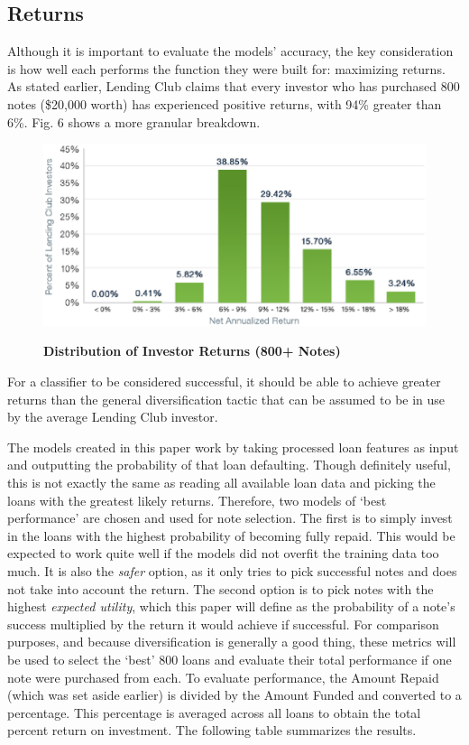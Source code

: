 \subsection{Returns}
\label{experiments.returns}
Although it is important to evaluate the models' accuracy, the key consideration is how well each performs the function 
they were built for: maximizing returns. As stated earlier, Lending Club claims that every investor who has purchased 
800 notes (\$20,000 worth) has experienced positive returns, with 94\% greater than 6\%. Fig. 6 shows a 
more granular breakdown.


\begin{figure}[!h]
    \centering
    \includegraphics[scale=0.5]{figs/lc_stats.eps}
    \label{fig:lc_stats}
    \caption{\textbf{Distribution of Investor Returns (800+ Notes)}}
\end{figure}

For a classifier to be considered successful, it should be able to achieve greater returns than the general diversification tactic
that can be assumed to be in use by the average Lending Club investor.

The models created in this paper work by taking processed loan features as input and outputting the probability of that loan
defaulting. Though definitely useful, this is not exactly the same as reading all available loan data and picking the loans 
with the greatest likely returns. Therefore, two models of `best performance' are chosen and used for note selection. 
The first is to simply invest in the loans with the highest probability of becoming fully repaid. This would be expected to work
quite well if the models did not overfit the training data too much. It is also the \emph{safer} option, as it only tries
to pick successful notes and does not take into account the return. The second option is to pick notes with the highest 
\emph{expected utility}, which this paper will define as the probability of a note's success multiplied by the return it would achieve
if successful. For comparison purposes, and because diversification is generally a good thing, these metrics will be used to 
select the `best' 800 loans and evaluate their total performance if one note were purchased from each. To evaluate performance,
the Amount Repaid (which was set aside earlier) is divided by the Amount Funded and converted to a percentage. This percentage 
is averaged across all loans to obtain the total percent return on investment. The following table summarizes the results. 


